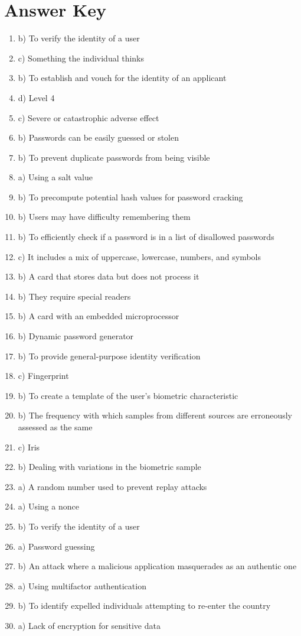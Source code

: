 \documentclass{article}
\begin{document}
\section*{Answer Key}
\begin{enumerate}
    \item b) To verify the identity of a user  
    \item c) Something the individual thinks  
    \item b) To establish and vouch for the identity of an applicant  
    \item d) Level 4  
    \item c) Severe or catastrophic adverse effect  
    \item b) Passwords can be easily guessed or stolen  
    \item b) To prevent duplicate passwords from being visible  
    \item a) Using a salt value  
    \item b) To precompute potential hash values for password cracking  
    \item b) Users may have difficulty remembering them  
    \item b) To efficiently check if a password is in a list of disallowed passwords  
    \item c) It includes a mix of uppercase, lowercase, numbers, and symbols  
    \item b) A card that stores data but does not process it  
    \item b) They require special readers  
    \item b) A card with an embedded microprocessor  
    \item b) Dynamic password generator  
    \item b) To provide general-purpose identity verification  
    \item c) Fingerprint  
    \item b) To create a template of the user’s biometric characteristic  
    \item b) The frequency with which samples from different sources are erroneously assessed as the same  
    \item c) Iris  
    \item b) Dealing with variations in the biometric sample  
    \item a) A random number used to prevent replay attacks  
    \item a) Using a nonce  
    \item b) To verify the identity of a user  
    \item a) Password guessing  
    \item b) An attack where a malicious application masquerades as an authentic one  
    \item a) Using multifactor authentication  
    \item b) To identify expelled individuals attempting to re-enter the country  
    \item a) Lack of encryption for sensitive data  
\end{enumerate}
\end{document}
